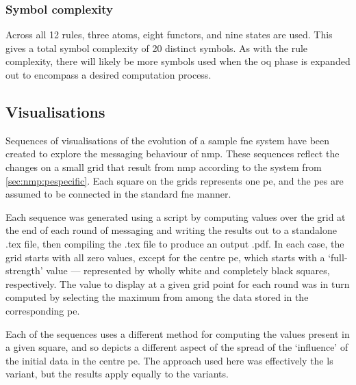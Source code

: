 \subsubsection{Symbol complexity}
Across all 12 rules, three atoms, eight functors, and nine states are used.  This gives a total symbol complexity of 20 distinct symbols.  As with the rule complexity, there will likely be more symbols used when the \gls{oq} phase is expanded out to encompass a desired computation process.

\subsection{Visualisations}
Sequences of visualisations of the evolution of a sample \gls{fne} system have been created to explore the messaging behaviour of \gls{nmp}.  These sequences reflect the changes on a small grid that result from \gls{nmp} according to the system from \cref{sec:nmp:pespecific}.  Each square on the grids represents one \gls{pe}, and the \glspl{pe} are assumed to be connected in the standard \gls{fne} manner.

Each sequence was generated using a script by computing values over the grid at the end of each round of messaging and writing the results out to a standalone .tex file, then compiling the .tex file to produce an output .pdf.  In each case, the grid starts with all zero values, except for the centre \gls{pe}, which starts with a `full-strength' value --- represented by wholly white and completely black squares, respectively.  The value to display at a given grid point for each round was in turn computed by selecting the maximum from among the data stored in the corresponding \gls{pe}.

Each of the sequences uses a different method for computing the values present in a given square, and so depicts a different aspect of the spread of the `influence' of the initial data in the centre \gls{pe}.  The approach used here was effectively the \gls{ls} variant, but the results apply equally to the variants.


